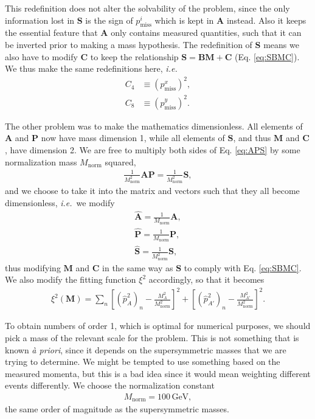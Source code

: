 \documentclass[twoside,english]{uiofysmaster}
\begin{document}
This redefinition does not alter the solvability of the problem, since the only information lost in $\mathbf{S}$ is the sign of $p_\mathrm{miss}^i$ which is kept in $\mathbf{A}$ instead. Also it keeps the essential feature that $\mathbf{A}$ only contains measured quantities, such that it can be inverted prior to making a mass hypothesis. The redefinition of $\mathbf{S}$ means we also have to modify $\mathbf{C}$ to keep the relationship $\mathbf{S} = \mathbf{B} \mathbf{M} + \mathbf{C}$ (Eq. \eqref{eq:SBMC}). We thus make the same redefinitions here, {\it i.e.}
\begin{align}
	C_4 &\equiv (p_\mathrm{miss}^x)^2, \label{eq:Cvec_modified} \\
	C_8 &\equiv (p_\mathrm{miss}^y)^2. \nonumber
\end{align}

The other problem was to make the mathematics dimensionless. All elements of $\mathbf{A}$ and $\mathbf{P}$ now have mass dimension 1, while all elements of $\mathbf{S}$, and thus $\mathbf{M}$ and $\mathbf{C}$, have dimension 2. We are free to multiply both sides of Eq. \eqref{eq:APS} by some normalization mass $M_\mathrm{norm}$ squared,
\begin{align}
	\frac{1}{M_\mathrm{norm}^2} \mathbf{A}\mathbf{P} = \frac{1}{M_\mathrm{norm}^2} \mathbf{S},
\end{align}
and we choose to take it into the matrix and vectors such that they all become dimensionless, {\it i.e.}\ we modify
\begin{align}
	\mathbf{\hat A} = \frac{1}{M_\mathrm{norm}}\mathbf{A},\nonumber \\
	\mathbf{\hat P} = \frac{1}{M_\mathrm{norm}}\mathbf{P},\label{eq:vectors_normalized}\\
	\mathbf{\hat S} = \frac{1}{M_\mathrm{norm}^2}\mathbf{S},\nonumber 
\end{align}
thus modifying $\mathbf{M}$ and $\mathbf{C}$ in the same way as $\mathbf{S}$ to comply with Eq. \eqref{eq:SBMC}. We also modify the fitting function $\xi^2$ accordingly, so that it becomes
\begin{align}
	\xi^2(\mathbf{M}) = \sum_n \left[(\hat p_{A}^2)_n - \frac{M_A^2}{M_\mathrm{norm}^2}\right]^2 + \left[(\hat p_{A'}^2)_n - \frac{M_{A'}^2}{M_\mathrm{norm}^2}\right]^2.\label{eq:xisquared_modified}
\end{align}

To obtain numbers of order 1, which is optimal for numerical purposes, we should pick a mass of the relevant scale for the problem. This is not something that is known {\it \`a priori}, since it depends on the supersymmetric masses that we are trying to determine. We might be tempted to use something based on the measured momenta, but this is a bad idea since it would mean weighting different events differently. We choose the normalization constant
\begin{align}
	M_\mathrm{norm} = 100 \,\mathrm{GeV},
\end{align}
the same order of magnitude as the supersymmetric masses.
\end{document}
